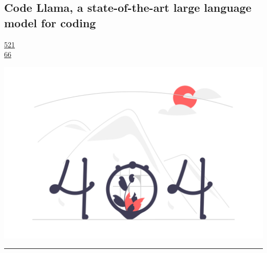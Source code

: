 \documentclass[10pt,a4paper]{article}
\begin{document}
\subsection{Code Llama, a state-of-the-art large language model for coding}
\noindent\begin{minipage}[t]{0.20\linewidth}
\vspace{0pt}
\noindent\textsc{\footnotesize
{\scriptsize\faThumbsOUp}\space 
\href{http://news.ycombinator.com/item?id=37248494\&utm\_term=comment}{521} \\
{\scriptsize\faComments}\space 
\href{http://news.ycombinator.com/item?id=37248494\&utm\_term=comment}{66} \\
}
\end{minipage} 
\begin{minipage}[t]{0.80\linewidth}
\vspace{0pt}
\begin{multicols}{2}

    \href{https://ai.meta.com/blog/code-llama-large-language-model-coding/?utm\_source=hackernewsletter\&utm\_medium=email\&utm\_term=fav}{
        \includegraphics[width=0.99\linewidth]{notfound.png}
    }
  


\end{multicols}
\end{minipage}
\par\medskip
\noindent\textcolor{red}{\rule{\linewidth}{0.2mm}}
\end{document}
